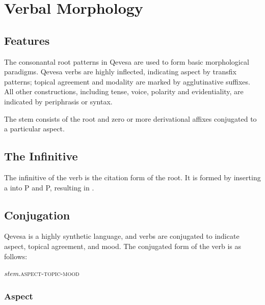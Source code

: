 \documentclass[grammar]{subfiles}
\begin{document}
  \chapter{Verbal Morphology}
  \label{ch:verbal_morphology}

  \section{Features}
  \label{sec:vm_features}

  The consonantal root patterns in Qevesa are used to form basic morphological paradigms. Qevesa verbs are highly inflected, indicating aspect by transfix patterns; topical agreement and modality are marked by agglutinative suffixes. All other constructions, including tense, voice, polarity and evidentiality, are indicated by periphrasis or syntax.

  The stem consists of the root and zero or more derivational affixes conjugated to a particular aspect. 

  \section{The Infinitive}
  \label{sec:vm_infinitive}

  The infinitive of the verb is the citation form of the root. It is formed by inserting a  into P and P, resulting in . 

  \section{Conjugation}
  \label{sec:vm_conjugation}

  Qevesa is a highly synthetic language, and verbs are conjugated to indicate aspect, topical agreement, and mood. The conjugated form of the verb is as follows:

  \begin{exe}
    \ex\label{exe:vm_conjugation} \textit{stem}\textsc{.aspect-topic-mood}
  \end{exe}

  \subsection{Aspect}
  \label{ssec:vm_aspect}
\end{document}
